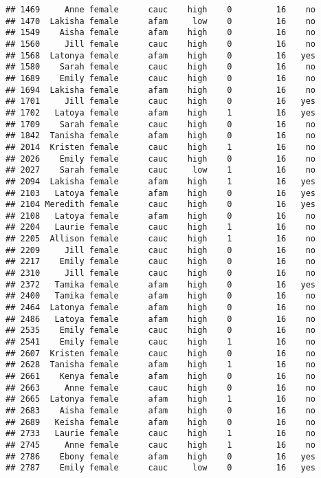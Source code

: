 \documentclass[
]{article}
\begin{document}
\begin{verbatim}
## 1469     Anne female      cauc    high    0         16    no
## 1470  Lakisha female      afam     low    0         16    no
## 1549    Aisha female      afam    high    0         16    no
## 1560     Jill female      cauc    high    0         16    no
## 1568  Latonya female      afam    high    0         16   yes
## 1580    Sarah female      cauc    high    0         16    no
## 1689    Emily female      cauc    high    0         16    no
## 1694  Lakisha female      afam    high    0         16    no
## 1701     Jill female      cauc    high    0         16   yes
## 1702   Latoya female      afam    high    1         16   yes
## 1709    Sarah female      cauc    high    0         16    no
## 1842  Tanisha female      afam    high    0         16    no
## 2014  Kristen female      cauc    high    1         16    no
## 2026    Emily female      cauc    high    0         16    no
## 2027    Sarah female      cauc     low    1         16    no
## 2094  Lakisha female      afam    high    1         16   yes
## 2103   Latoya female      afam    high    0         16   yes
## 2104 Meredith female      cauc    high    0         16   yes
## 2108   Latoya female      afam    high    0         16    no
## 2204   Laurie female      cauc    high    1         16    no
## 2205  Allison female      cauc    high    1         16    no
## 2209     Jill female      cauc    high    0         16    no
## 2217    Emily female      cauc    high    0         16    no
## 2310     Jill female      cauc    high    0         16    no
## 2372   Tamika female      afam    high    0         16   yes
## 2400   Tamika female      afam    high    0         16    no
## 2464  Latonya female      afam    high    0         16    no
## 2486   Latoya female      afam    high    0         16    no
## 2535    Emily female      cauc    high    0         16    no
## 2541    Emily female      cauc    high    1         16    no
## 2607  Kristen female      cauc    high    0         16    no
## 2628  Tanisha female      afam    high    1         16    no
## 2661    Kenya female      afam    high    0         16    no
## 2663     Anne female      cauc    high    0         16    no
## 2665  Latonya female      afam    high    1         16    no
## 2683    Aisha female      afam    high    0         16    no
## 2689   Keisha female      afam    high    0         16    no
## 2733   Laurie female      cauc    high    1         16    no
## 2745     Anne female      cauc    high    1         16    no
## 2786    Ebony female      afam    high    0         16   yes
## 2787    Emily female      cauc     low    0         16   yes

\end{verbatim}
\end{document}
